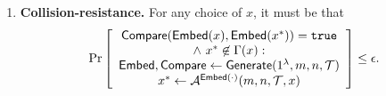 \documentclass[12pt]{article}
\begin{document}
\begin{definition}
\begin{enumerate}
    \item \textbf{Collision-resistance.} For any choice of $x$, it must be that
    \begin{align*}
        \Pr\left[
        \begin{array}{ccc}
            \begin{matrix}
                \mathsf{Compare}(\mathsf{Embed}(x), \mathsf{Embed}(x^*)) = \mathtt{true} \\ 
                \land\ x^* \not\in \Gamma(x): \\
                \mathsf{Embed}, \mathsf{Compare} \gets \mathsf{Generate}(1^\lambda, m, n, \mathcal{T}) \\
                x^* \gets \mathcal{A}^{\mathsf{Embed}(\cdot)}(m, n, \mathcal{T}, x) \\
            \end{matrix} \\
        \end{array}
        \right] \leq \epsilon.
    \end{align*}
    
\end{enumerate}

\end{definition}
\end{document}
